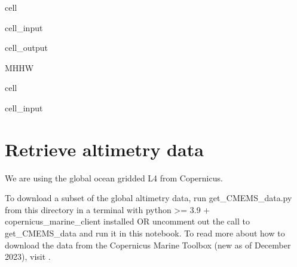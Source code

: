 \documentclass[letterpaper,10pt,english]{jupyterBook}
\begin{document}
\begin{sphinxuseclass}{cell}
\begin{sphinxVerbatimInput}
\begin{sphinxuseclass}{cell_input}
\end{sphinxuseclass}\end{sphinxVerbatimInput}
\begin{sphinxVerbatimOutput}

\begin{sphinxuseclass}{cell_output}
\begin{sphinxVerbatim}[commandchars=\\\{\}]
\PYGZsq{}MHHW\PYGZsq{}
\end{sphinxVerbatim}

\end{sphinxuseclass}\end{sphinxVerbatimOutput}

\end{sphinxuseclass}
\begin{sphinxuseclass}{cell}\begin{sphinxVerbatimInput}

\begin{sphinxuseclass}{cell_input}
\begin{sphinxVerbatim}[commandchars=\\\{\}]
  
\end{sphinxVerbatim}

\end{sphinxuseclass}\end{sphinxVerbatimInput}

\end{sphinxuseclass}

\chapter{Retrieve altimetry data}
\label{\detokenize{notebooks/SL_Data_Wrangling:retrieve-altimetry-data}}
\sphinxAtStartPar
We are using the global ocean gridded L4  from Copernicus.

\sphinxAtStartPar
To download a subset of the global altimetry data, run get\_CMEMS\_data.py from this directory in a terminal with python >= 3.9 + copernicus\_marine\_client installed OR uncomment out the call to get\_CMEMS\_data and run it in this notebook. To read more about how to download the data from the Copernicus Marine Toolbox (new as of December 2023), visit .
\end{document}
